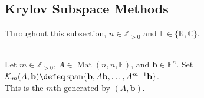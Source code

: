 \subsection{Krylov Subspace Methods}

Throughout this subsection, $n\in\mathbb{Z}_{>0}$ and $\mathbb{F}\in\{\mathbb{R},\mathbb{C}\}$.

\begin{definition} \label{def:krylov-subspace} \\
Let $m\in\mathbb{Z}_{>0}$, $A\in\operatorname{Mat}(n,n,\mathbb{F})$, and $\mathbf{b}\in\mathbb{F}^n$. Set $\mathcal{K}_m(A,\mathbf{b})\defeq\operatorname{span}\{\mathbf{b},A\mathbf{b},\ldots,A^{m-1}\mathbf{b}\}$.\\
This is the $m$th  generated by $(A,\mathbf{b})$.
\end{definition}

